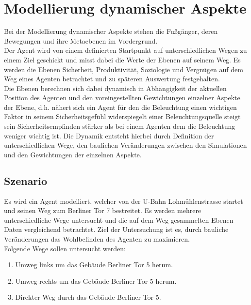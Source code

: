 \documentclass[10pt]{scrartcl}
\author{André Harms, Oliver Steenbuck, Armin Steudte  \\ Carsten Noetzel, Dennis Blauhut, Torben Becker}
\title{\titletext}
\date{16.11.2011}
\begin{document}
\maketitle

\setcounter{tocdepth}{3}
\tableofcontents

	\listoftables                                 												%
	\listoffigures   

\section{Modellierung dynamischer Aspekte}
Bei der Modellierung dynamischer Aspekte stehen die Fußgänger, deren Bewegungen und ihre Metaebenen im Vordergrund.\\
Der Agent wird von einem definierten Startpunkt auf unterschiedlichen Wegen zu einem Ziel geschickt und misst dabei die Werte der Ebenen auf seinem Weg. Es werden die Ebenen Sicherheit, Produktivität, Soziologie und Vergnügen auf dem Weg eines Agenten betrachtet und zu späteren Auswertung festgehalten.\\
Die Ebenen berechnen sich dabei dynamisch in Abhängigkeit der aktuellen Position des Agenten und den voreingestellten Gewichtungen einzelner Aspekte der Ebene, d.h. nähert sich ein Agent für den die Beleuchtung einen wichtigen Faktor in seinem Sicherheitsgefühl widerspiegelt einer Beleuchtungsquelle steigt sein Sicherheitsempfinden stärker als bei einem Agenten dem die Beleuchtung weniger wichtig ist. Die Dynamik entsteht hierbei durch Definition der unterschiedlichen Wege, den baulichen Veränderungen zwischen den Simulationen und den Gewichtungen der einzelnen Aspekte.

\subsection{Szenario}
Es wird ein Agent modelliert, welcher von der U-Bahn Lohmühlenstrasse startet und seinen Weg zum Berliner Tor 7 bestreitet. Es werden mehrere unterschiedliche Wege untersucht und die auf dem Weg gesammelten Ebenen-Daten vergleichend betrachtet. Ziel der Untersuchung ist es, durch bauliche Veränderungen das Wohlbefinden des Agenten zu maximieren.\\

Folgende Wege sollen untersucht werden:

\begin{enumerate}
\item Umweg links um das Gebäude Berliner Tor 5 herum.
\item Umweg rechts um das Gebäude Berliner Tor 5 herum.
\item Direkter Weg durch das Gebäude Berliner Tor 5.
\end{enumerate}
\end{document}
